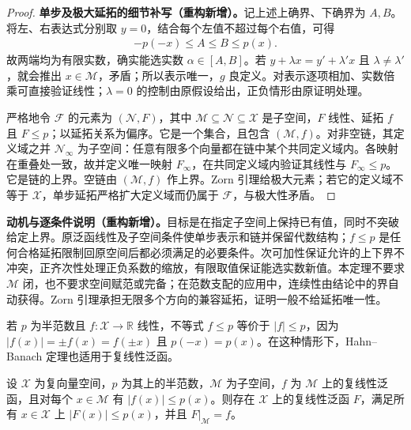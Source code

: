 \documentclass[../../main.tex]{subfiles}
\begin{document}
\begin{proof}
\textbf{单步及极大延拓的细节补写（重构新增）。}记上述上确界、下确界为 $A,B$。将左、右表达式分别取 $y=0$，结合每个左值不超过每个右值，可得
\begin{align*}
-p(-x)\le A\le B\le p(x).
\end{align*}
故两端均为有限实数，确实能选实数 $\alpha\in[A,B]$。若 $y+\lambda x=y'+\lambda'x$ 且 $\lambda\ne\lambda'$，就会推出 $x\in\mathcal M$，矛盾；所以表示唯一，$g$ 良定义。对表示逐项相加、实数倍乘可直接验证线性；$\lambda=0$ 的控制由原假设给出，正负情形由原证明处理。

严格地令 $\mathscr F$ 的元素为 $(\mathcal N,F)$，其中 $\mathcal M\subseteq\mathcal N\subseteq\mathcal X$ 是子空间，$F$ 线性、延拓 $f$ 且 $F\le p$；以延拓关系为偏序。它是一个集合，且包含 $(\mathcal M,f)$。对非空链，其定义域之并 $\mathcal N_\infty$ 为子空间：任意有限多个向量都在链中某个共同定义域内。各映射在重叠处一致，故并定义唯一映射 $F_\infty$，在共同定义域内验证其线性与 $F_\infty\le p$。它是链的上界。空链由 $(\mathcal M,f)$ 作上界。Zorn 引理给极大元素；若它的定义域不等于 $\mathcal X$，单步延拓严格扩大定义域而仍属于 $\mathscr F$，与极大性矛盾。
\end{proof}
\begin{remark}
\textbf{动机与逐条件说明（重构新增）。}目标是在指定子空间上保持已有值，同时不突破给定上界。原泛函线性及子空间条件使单步表示和链并保留代数结构；$f\le p$ 是任何合格延拓限制回原空间后都必须满足的必要条件。次可加性保证允许的上下界不冲突，正齐次性处理正负系数的缩放，有限取值保证能选实数新值。本定理不要求 $\mathcal M$ 闭，也不要求空间赋范或完备；在范数支配的应用中，连续性由结论中的界自动获得。Zorn 引理承担无限多个方向的兼容延拓，证明一般不给延拓唯一性。
\end{remark}
若 $p$ 为半范数且 $f:\mathcal X\to\mathbb R$ 线性，不等式 $f\le p$ 等价于 $|f|\le p$，因为 $|f(x)|=\pm f(x)=f(\pm x)$ 且 $p(-x)=p(x)$。在这种情形下，Hahn--Banach 定理也适用于复线性泛函。
\begin{theorem}\label{theorem:ch05-complex-hahn-banach}
设 $\mathcal X$ 为复向量空间，$p$ 为其上的半范数，$\mathcal M$ 为子空间，$f$ 为 $\mathcal M$ 上的复线性泛函，且对每个 $x\in\mathcal M$ 有 $|f(x)|\le p(x)$。则存在 $\mathcal X$ 上的复线性泛函 $F$，满足所有 $x\in\mathcal X$ 上 $|F(x)|\le p(x)$，并且 $F|_{\mathcal M}=f$。
\end{theorem}
\end{document}
